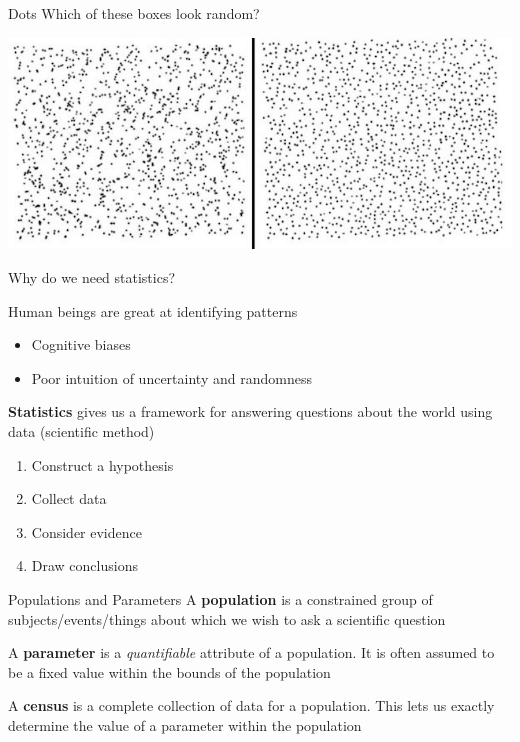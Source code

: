 \documentclass{beamer}
\begin{document}
\begin{frame}{Dots}
Which of these boxes look random?
\begin{center}
\includegraphics[scale=0.4]{img/random_dots.jpg}
\end{center}
\end{frame}

\begin{frame}{Why do we need statistics?}

Human beings are great at identifying patterns
\begin{itemize}
\item Cognitive biases
\item Poor intuition of uncertainty and randomness
\end{itemize}
\vspace{4mm}

\textbf{Statistics} gives us a framework for answering questions about the world using data (scientific method)

\begin{enumerate}
\item Construct a hypothesis
\item Collect data
\item Consider evidence
\item Draw conclusions
\end{enumerate}

\end{frame}

\begin{frame}{Populations and Parameters}
A \textbf{population} is a constrained group of subjects/events/things about which we wish to ask a scientific question \vspace{4mm}

A \textbf{parameter} is a \textit{quantifiable} attribute of a population. It is often assumed to be a fixed value within the bounds of the population \vspace{4mm}

A \textbf{census} is a complete collection of data for a population. This lets us exactly determine the value of a parameter within the population

\end{frame}
\end{document}
